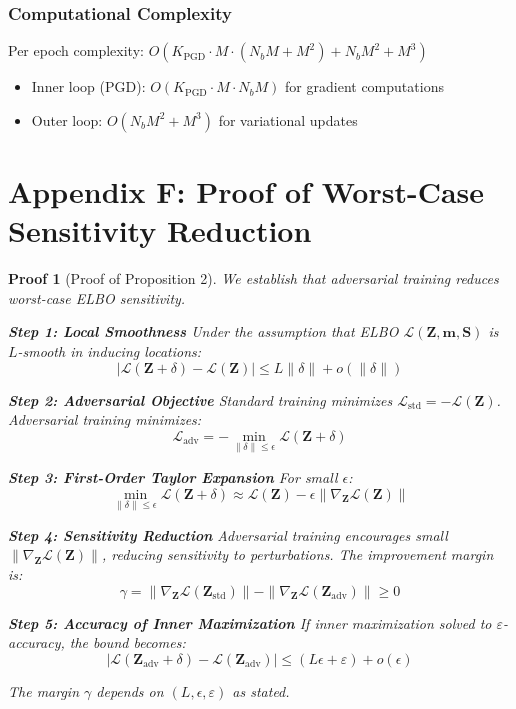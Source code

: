 \documentclass[12pt]{article}
\newtheorem{proof_sketch}{Proof}
\begin{document}
\subsubsection{Computational Complexity}
Per epoch complexity: $O(K_{\text{PGD}} \cdot M \cdot (N_b M + M^2) + N_b M^2 + M^3)$
\begin{itemize}
\item Inner loop (PGD): $O(K_{\text{PGD}} \cdot M \cdot N_b M)$ for gradient computations
\item Outer loop: $O(N_b M^2 + M^3)$ for variational updates
\end{itemize}

\section{Appendix F: Proof of Worst-Case Sensitivity Reduction}

\begin{proof_sketch}[Proof of Proposition 2]
We establish that adversarial training reduces worst-case ELBO sensitivity.

\textbf{Step 1: Local Smoothness}
Under the assumption that ELBO $\mathcal{L}(\mathbf{Z}, \mathbf{m}, \mathbf{S})$ is $L$-smooth in inducing locations:
\begin{equation}
|\mathcal{L}(\mathbf{Z} + \delta) - \mathcal{L}(\mathbf{Z})| \leq L\|\delta\| + o(\|\delta\|)
\end{equation}

\textbf{Step 2: Adversarial Objective}
Standard training minimizes $\mathcal{L}_{\text{std}} = -\mathcal{L}(\mathbf{Z})$. Adversarial training minimizes:
\begin{equation}
\mathcal{L}_{\text{adv}} = -\min_{\|\delta\| \leq \epsilon} \mathcal{L}(\mathbf{Z} + \delta)
\end{equation}

\textbf{Step 3: First-Order Taylor Expansion}
For small $\epsilon$:
\begin{equation}
\min_{\|\delta\| \leq \epsilon} \mathcal{L}(\mathbf{Z} + \delta) \approx \mathcal{L}(\mathbf{Z}) - \epsilon \|\nabla_{\mathbf{Z}} \mathcal{L}(\mathbf{Z})\|
\end{equation}

\textbf{Step 4: Sensitivity Reduction}
Adversarial training encourages small $\|\nabla_{\mathbf{Z}} \mathcal{L}(\mathbf{Z})\|$, reducing sensitivity to perturbations. The improvement margin is:
\begin{equation}
\gamma = \|\nabla_{\mathbf{Z}} \mathcal{L}(\mathbf{Z}_{\text{std}})\| - \|\nabla_{\mathbf{Z}} \mathcal{L}(\mathbf{Z}_{\text{adv}})\| \geq 0
\end{equation}

\textbf{Step 5: Accuracy of Inner Maximization}
If inner maximization solved to $\varepsilon$-accuracy, the bound becomes:
\begin{equation}
|\mathcal{L}(\mathbf{Z}_{\text{adv}} + \delta) - \mathcal{L}(\mathbf{Z}_{\text{adv}})| \leq (L\epsilon + \varepsilon) + o(\epsilon)
\end{equation}

The margin $\gamma$ depends on $(L, \epsilon, \varepsilon)$ as stated.
\end{proof_sketch}
\end{document}
